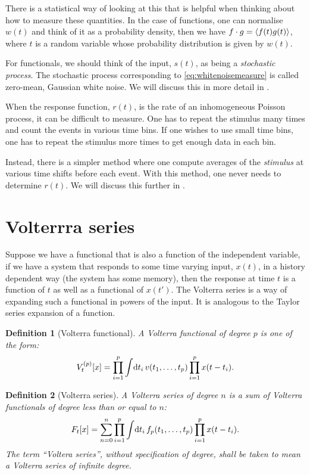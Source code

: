 \documentclass[12pt]{article}
\theoremstyle{slplain}
\theoremstyle{sldefinition}
\newtheorem{defn}{Definition}
\theoremstyle{remark}
\begin{document}
There is a statistical way of looking at this that is helpful when thinking about how to measure these quantities. In the case of functions, one can normalise $w(t)$ and think of it as a probability density, then we have $f \cdot g = \left\langle f(t)g(t) \right\rangle$, where $t$ is a random variable whose probability distribution is given by $w(t)$.

For functionals, we should think of the input, $s(t)$, as being a \emph{stochastic process}. The stochastic process corresponding to \eqref{eq:whitenoisemeasure} is called zero-mean, Gaussian white noise. We will discuss this in more detail in .

When the response function, $r(t)$, is the rate of an inhomogeneous Poisson process, it can be difficult to measure. One has to repeat the stimulus many times and count the events in various time bins. If one wishes to use small time bins, one has to repeat the stimulus more times to get enough data in each bin.

Instead, there is a simpler method where one compute averages of the \emph{stimulus} at various time shifts before each event. With this method, one never needs to determine $r(t)$. We will discuss this further in .


\section{Volterrra series}\label{sec:volterra}

Suppose we have a functional that is also a function of the independent variable, \eg if we have a system that responds to some time varying input, $x(t)$, in a history dependent way (\ie the system has some memory), then the response at time $t$ is a function of $t$ as well as a functional of $x(t')$.
The Volterra series is a way of expanding such a functional in powers of the input. It is analogous to the Taylor series expansion of a function.

\begin{defn}[Volterra functional]
A Volterra functional of degree $p$ is one of the form:
%
\begin{equation}\label{eq:volfunc}
  V^{(p)}_t[x] = \prod_{i=1}^p \int\!\mathrm{d} t_i\,  v(t_1,\ldots,t_p) \prod_{i=1}^p x(t-t_i).
\end{equation}
%
\end{defn}

\begin{defn}[Volterra series]
  A Volterra series of degree $n$ is a sum of Volterra functionals of degree less than or equal to $n$:
%
\begin{equation}\label{eq:volser}
  F_t[x] = \sum_{n=0}^n\prod_{i=1}^p \int\!\mathrm{d} t_i\,  f_p(t_1,\ldots,t_p) \prod_{i=1}^p x(t-t_i).
\end{equation}
%
  The term ``Voltera series'', without specification of degree, shall be taken to mean a Volterra series of infinite degree.
\end{defn}
\end{document}
